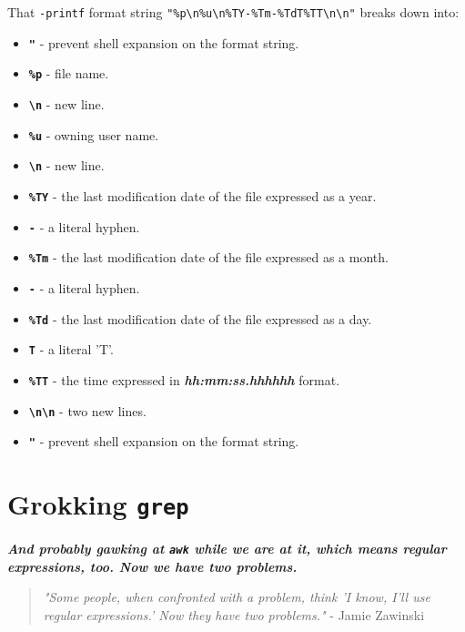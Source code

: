 \documentclass[10pt,american,]{book}
\providecommand{\tightlist}{%
  \setlength{\itemsep}{0pt}\setlength{\parskip}{0pt}}
\numberwithin{figure}{chapter}
\begin{document}
That \texttt{-printf} format string
\texttt{"\%p\textbackslash{}n\%u\textbackslash{}n\%TY-\%Tm-\%TdT\%TT\textbackslash{}n\textbackslash{}n"}
breaks down into: 

\begin{itemize}
\tightlist
\item
  \textbf{\texttt{"}} - prevent shell expansion on the format string.
\item
  \textbf{\texttt{\%p}} - file name.
\item
  \textbf{\texttt{\textbackslash{}n}} - new line.
\item
  \textbf{\texttt{\%u}} - owning user name.
\item
  \textbf{\texttt{\textbackslash{}n}} - new line.
\item
  \textbf{\texttt{\%TY}} - the last modification date of the file
  expressed as a year.
\item
  \textbf{\texttt{-}} - a literal hyphen.
\item
  \textbf{\texttt{\%Tm}} - the last modification date of the file
  expressed as a month.
\item
  \textbf{\texttt{-}} - a literal hyphen.
\item
  \textbf{\texttt{\%Td}} - the last modification date of the file
  expressed as a day.
\item
  \textbf{\texttt{T}} - a literal 'T'.
\item
  \textbf{\texttt{\%TT}} - the time expressed in
  \textbf{\emph{hh:mm:ss.hhhhhh}} format.
\item
  \textbf{\texttt{\textbackslash{}n\textbackslash{}n}} - two new lines.
\item
  \textbf{\texttt{"}} - prevent shell expansion on the format string.
\end{itemize}

\hypertarget{grokking-grep}{\chapter{\texorpdfstring{Grokking
\texttt{grep}}{Grokking grep}}\label{grokking-grep}}

\textbf{\emph{And probably gawking at \texttt{awk} while we are at it,
which means regular expressions, too. Now we have two problems.}}

\begin{quote}
\emph{"Some people, when confronted with a problem, think 'I know, I'll
use regular expressions.' Now they have two problems."} - Jamie Zawinski
\end{quote}
\end{document}
